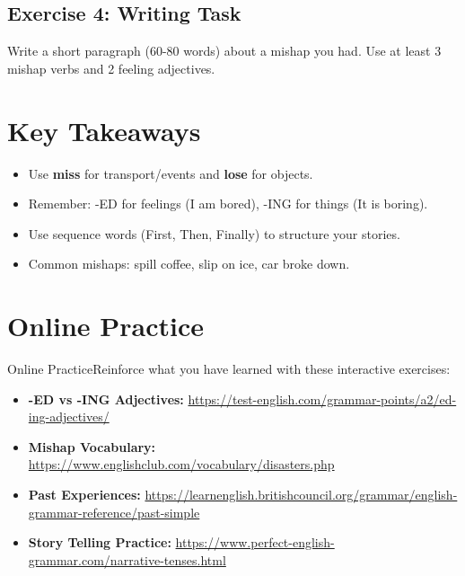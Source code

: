 \subsection{Exercise 4: Writing Task}
Write a short paragraph (60-80 words) about a mishap you had. Use at least 3 mishap verbs and 2 feeling adjectives.

\begin{tcolorbox}[colback=white,height=5cm]
\end{tcolorbox}

\section{Key Takeaways}
\begin{itemize}
    \item Use \textbf{miss} for transport/events and \textbf{lose} for objects.
    \item Remember: -ED for feelings (I am bored), -ING for things (It is boring).
    \item Use sequence words (First, Then, Finally) to structure your stories.
    \item Common mishaps: spill coffee, slip on ice, car broke down.
\end{itemize}

\section{Online Practice}
\begin{tcolorbox}[colback=blue!5,colframe=blue!40!black,title=Resources to Practice]
Online PracticeReinforce what you have learned with these interactive exercises:
\begin{itemize}
    \item \textbf{-ED vs -ING Adjectives:} \url{https://test-english.com/grammar-points/a2/ed-ing-adjectives/}
    \item \textbf{Mishap Vocabulary:} \url{https://www.englishclub.com/vocabulary/disasters.php}
    \item \textbf{Past Experiences:} \url{https://learnenglish.britishcouncil.org/grammar/english-grammar-reference/past-simple}
    \item \textbf{Story Telling Practice:} \url{https://www.perfect-english-grammar.com/narrative-tenses.html}
\end{itemize}
\end{tcolorbox}



